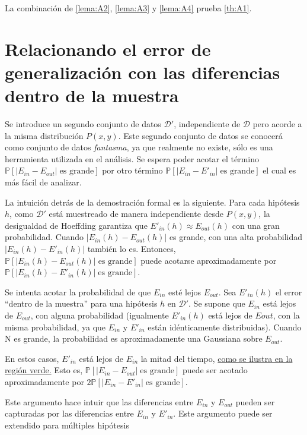 La combinación de \ref{lema:A2}, \ref{lema:A3} y \ref{lema:A4} prueba \ref{th:A1}.

\section{Relacionando el error de generalización con las diferencias dentro
de la muestra}

Se introduce un segundo conjunto de datos $\mathcal{D}'$, independiente de
$\mathcal{D}$ pero acorde a la misma distribución $P(x,y)$. Este segundo conjunto
de datos se conocerá como conjunto de datos \emph{fantasma}, ya que realmente
no existe, sólo es una herramienta utilizada en el análisis. Se espera poder
acotar el término $\mathbb{P} \left[| E_{in} - E_{out} | \;\text{es grande} \right]$
por otro término $\mathbb{P} \left[| E_{in} - E'_{in} | \;\text{es grande} \right]$
el cual es más fácil de analizar.

La intuición detrás de la demostración formal es la siguiente. Para cada hipótesis
$h$, como $\mathcal{D}'$ está muestreado de manera independiente desde $P(x,y)$,
la desigualdad de Hoeffding garantiza que $E'_{in}(h) \approx E_{out}(h)$ con
una gran probabilidad. Cuando $| E_{in}(h) - E_{out}(h) |$ es grande, con una
alta probabilidad $| E_{in}(h) - E'_{in}(h) |$ también lo es. Entonces,
$\mathbb{P} \left[| E_{in}(h) - E_{out}(h) | \;\text{es grande} \right]$ puede acotarse aproximadamente por
$\mathbb{P} \left[| E_{in}(h) - E'_{in}(h) | \;\text{es grande} \right]$.


Se intenta acotar la probabilidad de que $E_{in}$ esté lejos $E_{out}$. Sea
$E'_{in}(h)$ el error ``dentro de la muestra'' para una hipótesis $h$ en $\mathcal{D}'$.
Se supone que $E_{in}$ está lejos de $E_{out}$, con alguna probabilidad
(igualmente $E'_{in}(h)$ está lejos de $E{out}$, con la misma probabilidad, ya
que $E_{in}$ y $E'_{in}$ están idénticamente distribuidas). Cuando N es grande,
la probabilidad es aproximadamente una Gaussiana sobre $E_{out}$.


En estos casos, $E'_{in}$ está lejos de $E_{in}$ la mitad del tiempo,
\underline{como se ilustra en la región verde.} Esto es,
$\mathbb{P} \left[| E_{in} - E_{out} | \;\text{es grande} \right]$
puede ser acotado aproximadamente por
$2   \mathbb{P} \left[| E_{in} - E'_{in} | \;\text{es grande} \right]$.

Este argumento hace intuir que las diferencias entre $E_{in}$ y $E_{out}$ pueden
ser capturadas por las diferencias entre $E_{in}$ y $E'_{in}$.
Este argumento puede ser extendido para múltiples hipótesis


